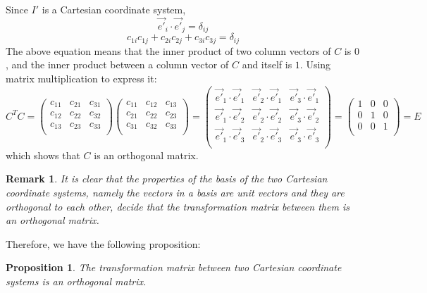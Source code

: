 \documentclass[onecolumn]{ctexart}
\newtheorem{proposition}{Proposition}
\newtheorem{remark}{Remark}
\begin{document}
Since $I'$ is a Cartesian coordinate system,
\[
  \vec{e'}_i \cdot \vec{e'}_j = \delta_{ij}
\]
\[
  c_{1i} c_{1j} + c_{2i} c_{2j} + c_{3i} c_{3j} = \delta_{ij}
\]
The above equation means that the inner product of two column vectors of $C$ is 
$0$, and the inner product between a column vector of $C$ and itself is $1$. 
Using matrix multiplication to express it:
\[
  C^T C = 
  \begin{pmatrix}
    c_{11} & c_{21} & c_{31} \\
    c_{12} & c_{22} & c_{32} \\
    c_{13} & c_{23} & c_{33} \\
  \end{pmatrix}
  \begin{pmatrix}
    c_{11} & c_{12} & c_{13} \\
    c_{21} & c_{22} & c_{23} \\
    c_{31} & c_{32} & c_{33} \\
  \end{pmatrix} = 
  \begin{pmatrix}
    \vec{e'}_1 \cdot \vec{e'}_1 & \vec{e'}_2 \cdot \vec{e'}_1 & \vec{e'}_3 \cdot \vec{e'}_1 \\
    \vec{e'}_1 \cdot \vec{e'}_2 & \vec{e'}_2 \cdot \vec{e'}_2 & \vec{e'}_3 \cdot \vec{e'}_2 \\
    \vec{e'}_1 \cdot \vec{e'}_3 & \vec{e'}_2 \cdot \vec{e'}_3 & \vec{e'}_3 \cdot \vec{e'}_3 \\
  \end{pmatrix} = 
  \begin{pmatrix}
    1 & 0 & 0 \\
    0 & 1 & 0 \\
    0 & 0 & 1 \\
  \end{pmatrix} = E
\]
which shows that $C$ is an orthogonal matrix.

\begin{remark}
  It is clear that the properties of the basis of the two Cartesian coordinate 
  systems, namely the vectors in a basis are unit vectors and they are 
  orthogonal to each other, decide that the transformation matrix between them 
  is an orthogonal matrix.
\end{remark}

Therefore, we have the following proposition:
\begin{proposition}
  The transformation matrix between two Cartesian coordinate systems is an 
  orthogonal matrix.
\end{proposition}
\end{document}
